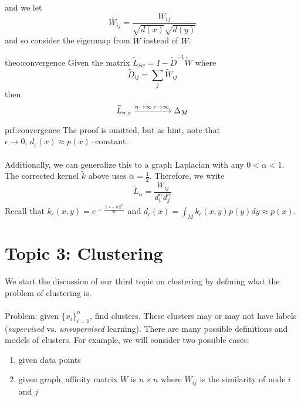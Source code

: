 \documentclass[12pt]{article}
\begin{document}
and we let
\[
\widetilde{W_{ij}} = \frac{W_{ij}}{\sqrt{d(x)} \sqrt{d(y)}}
\]
and so consider the eigenmap from $ \widetilde{W} $ instead of $ W $.
\begin{theo}{theo:convergence}
	Given the matrix $ \widetilde{L}_{rw} = I - \widetilde{D}^{-1} \widetilde{W} $ where
	\[
	\widetilde{D}_{ij} = \sum_j \widetilde{W}_{ij}
	\]
	then
	\[
	\widetilde{L}_{n, \epsilon} \xrightarrow{n \to \infty \\ \epsilon \to \infty} \Delta_M
	\]
\end{theo}
\begin{prf}{prf:convergence}
	The proof is omitted, but as hint, note that $ \epsilon \to 0, \, d_{\epsilon} (x) \approx p(x) \cdot \text{constant} $.
	\\ \\
	Additionally, we can generalize this to a graph Laplacian with any $ 0 < \alpha < 1 $.
	The corrected kernel $\widetilde{k}$ above uses $\alpha = \frac{1}{2}$.
	Therefore, we write
	\[
	\widetilde{L}_{\alpha} = \frac{W_{ij}}{d_i^{\alpha} d_j^{\alpha}}
	\]
	Recall that $k_{\epsilon} (x, y) = e^{= \frac{\| x - y \|^2}{2 \epsilon}}$ and $d_{\epsilon} (x) = \int_M k_{\epsilon} (x, y) p(y) dy \approx p(x)$.
\end{prf}

\section{Topic 3: Clustering}
We start the discussion of our third topic on clustering by defining what the problem of clustering is.
\\ \\
Problem: given $ \{ x_i \}_{i = 1}^n $, find clusters.
These clusters may or may not have labels (\textit{supervised} vs. \textit{unsupervised} learning).
There are many possible definitions and models of clusters.
For example, we will consider two possible cases:
\begin{enumerate}
    \item given data points
    \item given graph, affinity matrix $W $ is $ n \times n $ where $ W_{ij} $ is the similarity of node $ i $ and $ j $
\end{enumerate}
\end{document}
